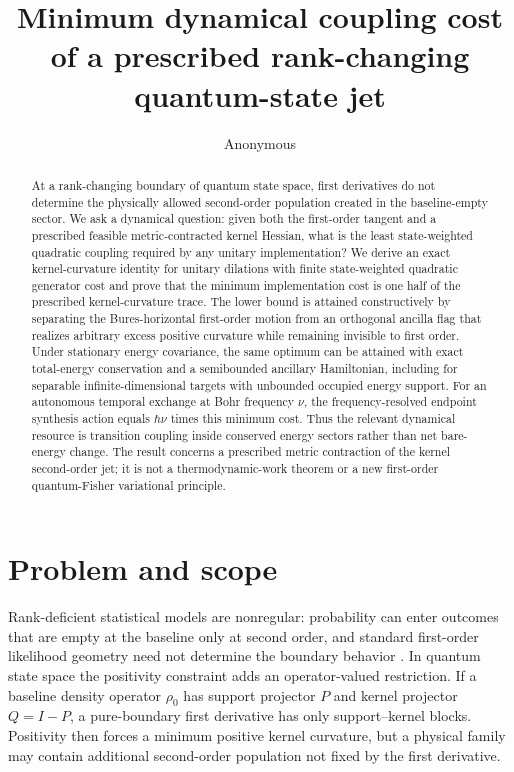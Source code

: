 \documentclass[aps,pra,preprint,nofootinbib]{revtex4-2}
\newcommand{\rhozero}{\rho_0}
\begin{document}
\title{Minimum dynamical coupling cost of a prescribed rank-changing quantum-state jet}
\author{Anonymous}

\begin{abstract}
At a rank-changing boundary of quantum state space, first derivatives do not determine the physically allowed second-order population created in the baseline-empty sector. We ask a dynamical question: given both the first-order tangent and a prescribed feasible metric-contracted kernel Hessian, what is the least state-weighted quadratic coupling required by any unitary implementation? We derive an exact kernel-curvature identity for unitary dilations with finite state-weighted quadratic generator cost and prove that the minimum implementation cost is one half of the prescribed kernel-curvature trace. The lower bound is attained constructively by separating the Bures-horizontal first-order motion from an orthogonal ancilla flag that realizes arbitrary excess positive curvature while remaining invisible to first order. Under stationary energy covariance, the same optimum can be attained with exact total-energy conservation and a semibounded ancillary Hamiltonian, including for separable infinite-dimensional targets with unbounded occupied energy support. For an autonomous temporal exchange at Bohr frequency $\nu$, the frequency-resolved endpoint synthesis action equals $\hbar\nu$ times this minimum cost. Thus the relevant dynamical resource is transition coupling inside conserved energy sectors rather than net bare-energy change. The result concerns a prescribed metric contraction of the kernel second-order jet; it is not a thermodynamic-work theorem or a new first-order quantum-Fisher variational principle.
\end{abstract}

\maketitle

\section{Problem and scope}

Rank-deficient statistical models are nonregular: probability can enter outcomes that are empty at the baseline only at second order, and standard first-order likelihood geometry need not determine the boundary behavior \cite{Chernoff1954,Shapiro1985,SelfLiang1987,Safranek2017}. In quantum state space the positivity constraint adds an operator-valued restriction. If a baseline density operator $\rhozero$ has support projector $P$ and kernel projector $Q=I-P$, a pure-boundary first derivative has only support--kernel blocks. Positivity then forces a minimum positive kernel curvature, but a physical family may contain additional second-order population not fixed by the first derivative.
\end{document}
